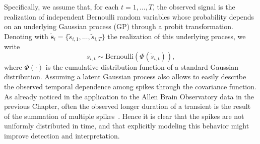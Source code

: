 Specifically, we assume that, for each $t=1,\dots,T$, the observed signal is the realization of independent Bernoulli random variables whose probability depends on an underlying Gaussian process (GP) through a probit transformation. Denoting with $\tilde{\bm{s}}_i = \{\tilde{s}_{i,1},\dots,\tilde{s}_{i,T}\}$ the realization of this underlying process, we write
\begin{equation*}
s_{i,t} \sim \mathrm{Bernoulli}(\Phi(\tilde{s}_{i,t})),
\end{equation*}
where $\Phi(\cdot)$ is the cumulative distribution function of a standard Gaussian distribution.
Assuming a latent Gaussian process also allows to easily describe the observed temporal dependence among spikes through the covariance function. As already noticed in the application to the Allen Brain Observatory data in the previous Chapter, often the observed longer duration of a transient is the result of the summation of multiple spikes~\parencite{dombeck2010}. Hence it is clear that the spikes are not uniformly distributed in time, and that explicitly modeling this behavior might improve detection and interpretation.

